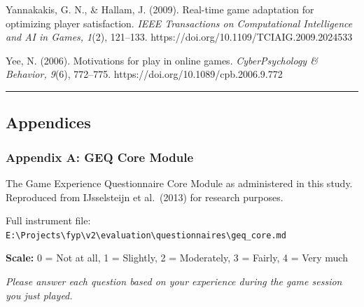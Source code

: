 Yannakakis, G. N., \& Hallam, J. (2009). Real-time game adaptation for
optimizing player satisfaction. \emph{IEEE Transactions on Computational
Intelligence and AI in Games, 1}(2), 121--133.
https://doi.org/10.1109/TCIAIG.2009.2024533

Yee, N. (2006). Motivations for play in online games.
\emph{CyberPsychology \& Behavior, 9}(6), 772--775.
https://doi.org/10.1089/cpb.2006.9.772

\begin{center}\rule{0.5\linewidth}{0.5pt}\end{center}

\subsection{Appendices}\label{appendices}

\subsubsection{Appendix A: GEQ Core
Module}\label{appendix-a-geq-core-module}

The Game Experience Questionnaire Core Module as administered in this
study. Reproduced from IJsselsteijn et al.~(2013) for research purposes.

Full instrument file:
\texttt{E:\textbackslash{}Projects\textbackslash{}fyp\textbackslash{}v2\textbackslash{}evaluation\textbackslash{}questionnaires\textbackslash{}geq\_core.md}

\textbf{Scale:} 0 = Not at all, 1 = Slightly, 2 = Moderately, 3 =
Fairly, 4 = Very much

\emph{Please answer each question based on your experience during the
game session you just played.}

